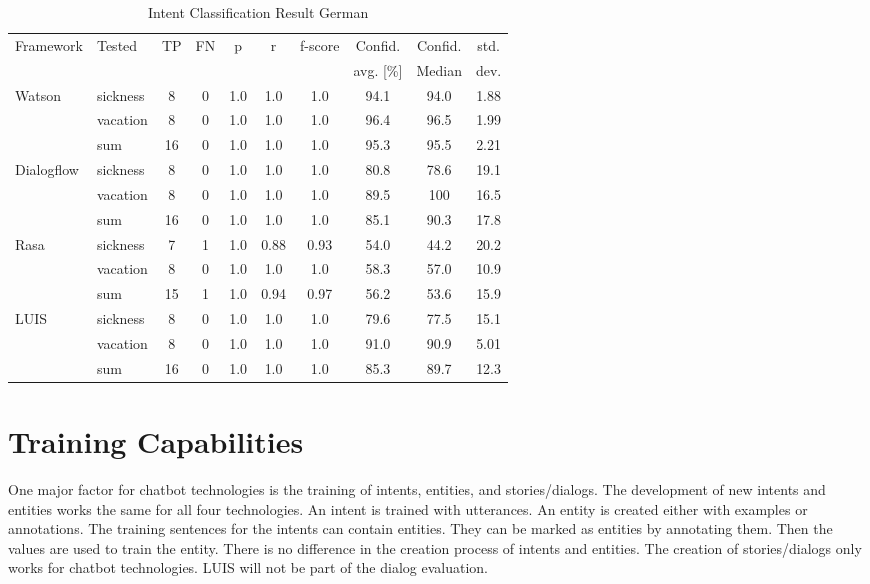 \begin{table}[h]
    \centering
    \begin{tabular}{ l | l | c | c | c | c | c | c | c | c }
        \multirow{2}{*}{Framework} & \multirow{2}{*}{Tested} & \multirow{2}{*}{TP} & \multirow{2}{*}{FN} & \multirow{2}{*}{p} & \multirow{2}{*}{r} & \multirow{2}{*}{f-score} & Confid. & Confid. & std.\\ 
                 &&          &            &   & & & avg. [\%] & Median & dev.  \\ \hline \hline
        \multirow{3}{*}{Watson} 
        & sickness & 8 & 0& 1.0& 1.0& 1.0&94.1& 94.0& 1.88\\
        & vacation & 8 & 0& 1.0& 1.0& 1.0&96.4& 96.5&1.99\\
        & sum      &16 & 0& 1.0& 1.0& 1.0&95.3& 95.5&2.21 \\ \hline
        
        \multirow{3}{*}{Dialogflow} 
        & sickness & 8& 0& 1.0& 1.0& 1.0&80.8& 78.6&19.1\\
        & vacation & 8& 0& 1.0& 1.0& 1.0&89.5& 100& 16.5\\
        & sum      &16& 0& 1.0& 1.0& 1.0&85.1&90.3 &17.8\\ \hline

        \multirow{3}{*}{Rasa} 
        & sickness & 7& 1& 1.0& 0.88  & 0.93& 54.0& 44.2&20.2\\
        & vacation & 8& 0& 1.0& 1.0& 1.0& 58.3& 57.0&10.9\\
        & sum      &15& 1& 1.0& 0.94& 0.97& 56.2&53.6 &15.9\\ \hline

        \multirow{3}{*}{LUIS} 
        & sickness & 8& 0& 1.0& 1.0 & 1.0& 79.6& 77.5&15.1\\
        & vacation & 8& 0& 1.0& 1.0 & 1.0& 91.0& 90.9&5.01\\
        & sum      & 16&0& 1.0& 1.0 & 1.0& 85.3& 89.7&12.3\\
    \end{tabular}
    \caption{Intent Classification Result German} \label{tab:intent_classification_result_de}
\end{table} \noindent

\section*{Training Capabilities}
One major factor for chatbot technologies is the training of intents, entities, and stories/dialogs.
The development of new intents and entities works the same for all four technologies.
An intent is trained with utterances.
An entity is created either with examples or annotations.
The training sentences for the intents can contain entities.
They can be marked as entities by annotating them.
Then the values are used to train the entity.
There is no difference in the creation process of intents and entities.
The creation of stories/dialogs only works for chatbot technologies.
LUIS will not be part of the dialog evaluation.

